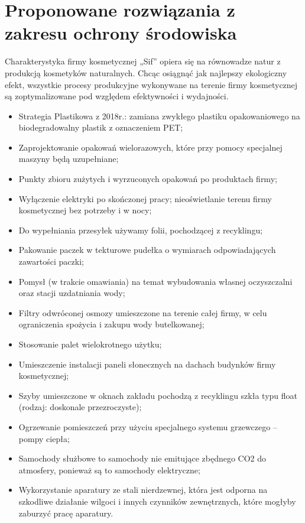 \section{Proponowane rozwiązania z zakresu ochrony środowiska}

Charakterystyka firmy kosmetycznej „Sif” opiera się na równowadze natur z produkcją kosmetyków naturalnych. Chcąc osiągnąć jak najlepszy ekologiczny efekt, wszystkie procesy produkcyjne wykonywane na terenie firmy kosmetycznej są zoptymalizowane pod względem efektywności i wydajności.

\begin{itemize}
	\item Strategia Plastikowa z 2018r.: zamiana zwykłego plastiku opakowaniowego na biodegradowalny plastik z oznaczeniem PET;
	\item Zaprojektowanie opakowań wielorazowych, które przy pomocy specjalnej maszyny będą uzupełniane;
	\item Punkty zbioru zużytych i wyrzuconych opakowań po produktach firmy;
	\item Wyłączenie elektryki po skończonej pracy; nieoświetlanie terenu firmy kosmetycznej bez potrzeby i w nocy;
	\item Do wypełniania przesyłek używamy folii, pochodzącej z recyklingu;
	\item Pakowanie paczek w tekturowe pudełka o wymiarach odpowiadających zawartości paczki;
	\item Pomysł (w trakcie omawiania) na temat wybudowania własnej oczyszczalni oraz stacji uzdatniania wody;
	\item Filtry odwróconej osmozy umieszczone na terenie całej firmy, w celu ograniczenia spożycia i zakupu wody butelkowanej;
	\item Stosowanie palet wielokrotnego użytku;
	\item Umieszczenie instalacji paneli słonecznych na dachach budynków firmy kosmetycznej;
	\item Szyby umieszczone w oknach zakładu pochodzą z recyklingu szkła typu float (rodzaj: doskonale przezroczyste);
	\item Ogrzewanie pomieszczeń przy użyciu specjalnego systemu grzewczego – pompy ciepła;
	\item Samochody służbowe to samochody nie emitujące zbędnego CO2 do atmosfery, ponieważ są to samochody elektryczne;
	\item Wykorzystanie aparatury ze stali nierdzewnej, która jest odporna na szkodliwe działanie wilgoci i innych czynników zewnętrznych, które mogłyby zaburzyć pracę aparatury.
\end{itemize}
